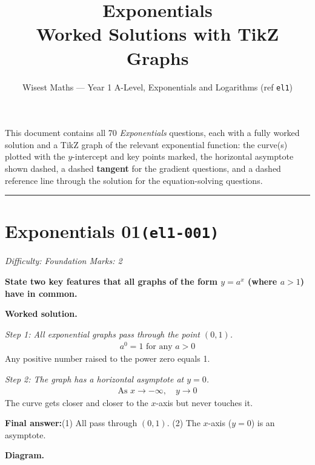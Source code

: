 \documentclass[11pt]{article}
\title{\textbf{Exponentials}\\[0.3em]\large Worked Solutions with TikZ Graphs}
\author{Wisest Maths --- Year 1 A-Level, Exponentials and Logarithms (ref \texttt{el1})}
\date{}
\newcommand{\question}[1]{\par\medskip\noindent\textbf{#1}\par}
\begin{document}
\maketitle
\noindent This document contains all 70 \emph{Exponentials} questions, each with a fully worked
solution and a TikZ graph of the relevant exponential function: the curve(s) plotted with the
\(y\)-intercept and key points marked, the horizontal asymptote shown dashed, a dashed
\textbf{tangent} for the gradient questions, and a dashed reference line through the solution for
the equation-solving questions.
\tableofcontents
\bigskip
\hrule

\section*{Exponentials 01\quad\small\texttt{(el1-001)}}
\textit{Difficulty: Foundation \quad\textbar\quad Marks: 2}

\question{State two key features that all graphs of the form \( y = a^x \) (where \( a > 1 \)) have in common.}

\textbf{Worked solution.}

\textit{Step 1: All exponential graphs pass through the point \( (0, 1) \).}
\[\begin{gathered}
a^0 = 1 \text{ for any } a > 0
\end{gathered}\]
Any positive number raised to the power zero equals 1.

\textit{Step 2: The graph has a horizontal asymptote at \( y = 0 \).}
\[\begin{gathered}
\text{As } x \to -\infty,\quad y \to 0
\end{gathered}\]
The curve gets closer and closer to the \( x \)-axis but never touches it.

\begin{answerbox}
\textbf{Final answer:}\quad (1) All pass through \(\displaystyle  (0, 1) \). (2) The \(\displaystyle  x \)-axis (\(\displaystyle  y = 0 \)) is an asymptote.
\end{answerbox}
\textbf{Diagram.}
\end{document}
